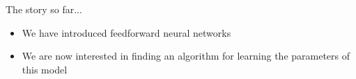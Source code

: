 \savestack{\nn}{}

\begin{frame}
\end{frame}

\begin{frame}
  \begin{block}{The story so far...}
    \begin{itemize}
      \justifying
      \item We have introduced feedforward neural networks
      \item We are now interested in finding an algorithm for learning the parameters of this model
    \end{itemize}
  \end{block}
\end{frame}

